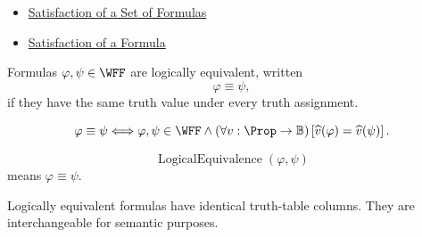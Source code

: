 \begin{dependencies}
\begin{itemize}
  \item \hyperref[def:satisfaction-set-propositional-logic]{Satisfaction of a Set of Formulas}
  \item \hyperref[def:satisfaction-propositional-formula]{Satisfaction of a Formula}
\end{itemize}
\end{dependencies}
\begin{tcolorbox}[colback=propbox, colframe=propborder, arc=2pt,
  left=6pt, right=6pt, top=4pt, bottom=4pt,
  title={\small\textbf{Definition (Logical Equivalence)}},
  fonttitle=\small\bfseries]
\begin{definition}
\label{def:logical-equivalence-propositional-logic}
Formulas \(\varphi,\psi\in\WFF\) are logically equivalent, written
\[
\varphi\equiv\psi,
\]
if they have the same truth value under every truth assignment.
\end{definition}
\end{tcolorbox}

\begin{remark*}
\[
\varphi\equiv\psi
\Longleftrightarrow
\varphi,\psi\in\WFF
\land
(\forall v:\Prop\to\mathbb{B})
\left[
\widehat v(\varphi)=\widehat v(\psi)
\right].
\]
\end{remark*}

\begin{remark*}
\[
\operatorname{LogicalEquivalence}(\varphi,\psi)
\]
means \(\varphi\equiv\psi\).
\end{remark*}

\begin{remark*}[Interpretation]
Logically equivalent formulas have identical truth-table columns. They are interchangeable for semantic purposes.
\end{remark*}

